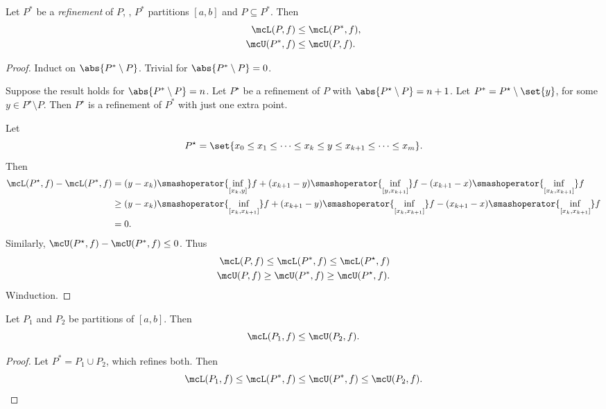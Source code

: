\begin{lemma} \label{thm:refinement}
    Let $P^*$ be a \emph{refinement} of $P$, \ie,
    $P^*$ partitions $[a, b]$ and $P \subseteq P^*$. Then \begin{align*}
        \mcL(P, f) &\le \mcL(P^*, f), \\
        \mcU(P^*, f) &\le \mcU(P, f).
    \end{align*}
\end{lemma}
\begin{proof}
    Induct on $\abs{P^* \setminus P}$.
    Trivial for $\abs{P^* \setminus P} = 0$.

    Suppose the result holds for $\abs{P^* \setminus P} = n$.
    Let $P^\star$ be a refinement of $P$ with
    $\abs{P^\star \setminus P} = n + 1$.
    Let $P^* = P^\star \setminus \set{y}$,
    for some $y \in P^\star \setminus P$.
    Then $P^\star$ is a refinement of $P^*$ with just one extra point.

    Let \[
        P^\star = \set{x_0 \le x_1 \le \dots
            \le x_k \le y \le x_{k+1} \le
            \dots \le x_m}.
    \] Then \begin{align*}
        \mcL(P^\star, f) - \mcL(P^*, f)
            &= (y - x_k) \smashoperator{\inf_{[x_k, y]}} f
                + (x_{k+1} - y) \smashoperator{\inf_{[y, x_{k+1}]}} f
                - (x_{k+1} - x) \smashoperator{\inf_{[x_k, x_{k+1}]}} f \\
            &\ge (y - x_k) \smashoperator{\inf_{[x_k, x_{k+1}]}} f
                + (x_{k+1} - y) \smashoperator{\inf_{[x_k, x_{k+1}]}} f
                - (x_{k+1} - x) \smashoperator{\inf_{[x_k, x_{k+1}]}} f \\
            &= 0.
    \end{align*}
    Similarly, $\mcU(P^\star, f) - \mcU(P^*, f) \le 0$.
    Thus \begin{align*}
        \mcL(P, f) \le \mcL(P^*, f) \le \mcL(P^\star, f) \\
        \mcU(P, f) \ge \mcU(P^*, f) \ge \mcU(P^\star, f).
    \end{align*}
    Winduction.
\end{proof}

\begin{lemma*}
    Let $P_1$ and $P_2$ be partitions of $[a, b]$.
    Then \[
        \mcL(P_1, f) \le \mcU(P_2, f).
    \]
\end{lemma*}
\begin{proof}
    Let $P^* = P_1 \cup P_2$, which refines both.
    Then \[
        \mcL(P_1, f) \le \mcL(P^*, f) \le \mcU(P^*, f) \le \mcU(P_2, f).
        \qedhere
    \]
\end{proof}

